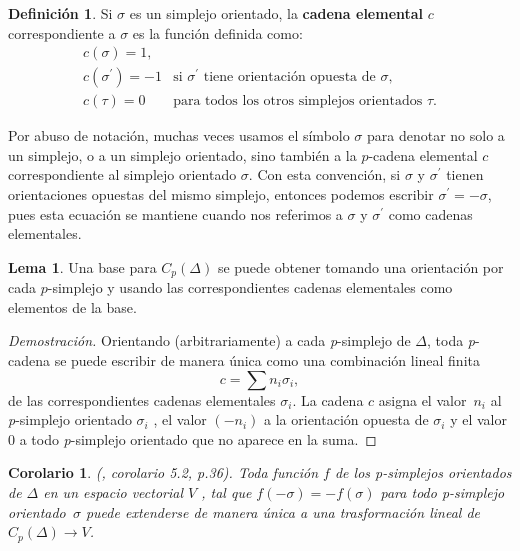 \documentclass[12pt]{book}
\newtheorem{corollary}[theorem]{Corolario}
\theoremstyle{definition}
\newtheorem{definition}[theorem]{Definición}
\newtheorem{lemma}[theorem]{Lema}
\newcounter{in}
\newcounter{ini}
\begin{document}
\begin{definition}
  Si $\sigma$ es un simplejo orientado, la \textbf{cadena elemental} $c$
  correspondiente a $\sigma$ es la función definida como:
  \[ 
  \begin{array}{cl}
    c(\sigma)=1, & \\
    c(\sigma^{'})=-1 & \mbox{si $\sigma^{'}$ tiene orientación opuesta de $\sigma$}, \\
    c(\tau)=0 & \mbox{para todos los otros simplejos orientados $\tau$}. 
  \end{array}\] 
  \end{definition}

Por abuso de notación, muchas veces usamos el símbolo $\sigma$ para
denotar no solo a un simplejo, o a un simplejo orientado, sino también
a la $p$-cadena elemental $c$ correspondiente al simplejo orientado
$\sigma$. Con esta convención, si $\sigma$ y $\sigma^{'}$ tienen
orientaciones opuestas del mismo simplejo, entonces podemos escribir
$\sigma^{'}=-\sigma$, pues esta ecuación se mantiene cuando nos
referimos a $\sigma$ y $\sigma^{'}$ como cadenas elementales.

\begin{lemma}
   Una base para $C_{p}(\Delta)$ se puede obtener
   tomando una orientación por cada $p$-simplejo y usando las
   correspondientes cadenas elementales como elementos de la base.
\end{lemma}

\begin{proof}[Demostración]
  Orientando (arbitrariamente) a cada \emph{p}-simplejo de $\Delta$,
  toda \emph{p}-cadena se puede escribir de manera única como una
  combinación lineal finita
$$c=\sum n_{i}\sigma_{i},$$
de las correspondientes cadenas elementales $\sigma_{i}$. La cadena
$c$ asigna el valor~$n_{i}$ al \emph{p}-simplejo orientado
$\sigma_{i}$ , el valor $(-n_{i})$ a la orientación opuesta de
$\sigma_{i}$ y el valor $0$ a todo \emph{p}-simplejo orientado que no
aparece en la suma. 
\end{proof}

\begin{corollary}{\normalfont(\cite{munkres1984elements}, corolario 5.2, p.36)}.
  Toda función $f$ de los p-simplejos orientados de $\Delta$ en un
  espacio vectorial $V$ , tal que $f(-\sigma)=-f(\sigma)$ para todo
  p-simplejo orientado~$\sigma$ puede extenderse de manera única a una
  trasformación lineal de $C_{p}(\Delta)\rightarrow V$.
\end{corollary}
\end{document}
